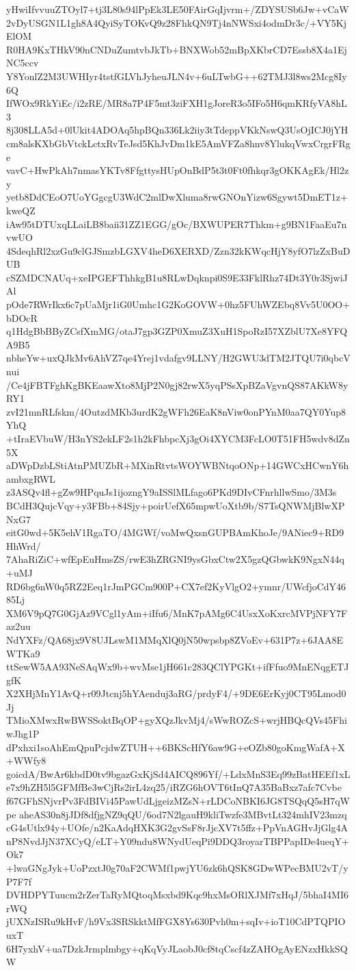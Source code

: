 yHwiIfvvuuZTOyl7+tj3L80s94lPpEk3LE50FAirGqIjvrm+/ZDYSUSb6Jw+vCaW
2vDyUSGN1L1gh8A4QyiSyTOKvQ9z28FhkQN9Tj4nNWSxi4odmDr3c/+VY5KjElOM
R0HA9KxTHkV90nCNDuZumtvbJkTb+BNXWob52mBpXKbrCD7Essb8X4a1EjNC5ccv
Y8YonlZ2M3UWHIyr4tstfGLVhJyheuJLN4v+6uLTwbG++62TMJ3l8ws2Mcg8Iy6Q
IfWOx9RkYiEc/i2zRE/MR8a7P4F5mt3ziFXH1gJoreR3o5IFo5H6qmKRfyVA8hL3
8j308LLA5d+0lUkit4ADOAq5hpBQn336Lk2iiy3tTdeppVKkNswQ3UsOjICJ0jYH
cm8alsKXbGbVtckLctxRvTeJsd5KhJvDm1kE5AmVFZa8hnv8YlukqVwxCrgrFRge
vavC+HwPkAh7nmasYKTv8FfgttysHUpOnBdP5t3t0Ft0fhkqr3gOKKAgEk/Hl2zy
yetb8DdCEoO7UoYGgcgU3WdC2mlDwXluma8rwGNOnYizw6Sgywt5DmET1z+kweQZ
iAw95tDTUxqLLaiLB8baii31ZZ1EGG/gOc/BXWUPER7Thkm+g9BN1FaaEu7nvwUO
4SdeqhRl2xzGu9clGJSmzbLGXV4heD6XERXD/Zzn32kKWqcHjY8yfO7lzZxBuDUB
cSZMDCNAUq+xeIPGEFThhkgB1u8RLwDqknpi0S9E33FklRhz74Dt3Y0r3SjwiJAl
pOde7RWrIkx6c7pUaMjr1iG0Umhc1G2KoGOVW+0hz5FUhWZEbq8Vv5U0OO+bDOcR
q1HdgBbBByZCsfXmMG/otaJ7gp3GZP0XmuZ3XuH1SpoRzI57XZblU7Xe8YFQA9B5
nbheYw+uxQJkMv6AhVZ7qe4Yrej1vdafgv9LLNY/H2GWU3dTM2JTQU7i0qbcVnui
/Ce4jFBTFghKgBKEaawXto8MjP2N0gj82rwX5yqPSsXpBZaVgvnQS87AKkW8yRY1
zvI21mnRLfskm/4OutzdMKb3urdK2gWFh26EaK8nViw0onPYnM0aa7QY0Yup8YhQ
+tIraEVbuW/H3nYS2ekLF2s1h2kFhbpcXj3gOi4XYCM3FcLO0T51FH5wdv8dZn5X
aDWpDzbLStiAtnPMUZbR+MXinRtvtsWOYWBNtqoONp+14GWCxHCwnY6hambxgRWL
z3ASQv4fl+gZw9HPquJs1ijozngY9aISSlMLfago6PKd9DIvCFnrhllwSmo/3M3s
BCdH3QujcVqy+y3FBb+84Sjy+poirUefX65mpwUoXtb9b/S7TsQNWMjBlwXPNxG7
eitG0wd+5K5ehV1RgaTO/4MGWf/voMwQxsnGUPBAmKhoJe/9ANiec9+RD9HhWrd/
7AhaRiZiC+wfEpEuHmsZS/rwE3hZRGNI9ysGbxCtw2X5gzQGbwkK9NgxN44q+uMJ
RD6bg6nW0q5RZ2Eeq1rJmPGCm900P+CX7ef2KyVlgO2+ymnr/UWcfjoCdY4685Lj
XM6V9pQ7G0GjAz9VCgl1yAm+iIfu6/MnK7pAMg6C4UsxXoKxrcMVPjNFY7Faz2uu
NdYXFz/QA68jx9V8UJLswM1MMqXlQ0jN50wpsbp8ZVoEv+631P7z+6JAA8EWTKa9
ttSewW5AA93NeSAqWx9b+wvMse1jH661c283QClYPGKt+ifFfuo9MnENqgETJgfK
X2XHjMnY1AvQ+r09Jtcnj5hYAenduj3aRG/prdyF4/+9DE6ErKyj0CT95Lmod0Jj
TMioXMwxRwBWSSoktBqOP+gyXQzJkvMj4/sWwROZcS+wrjHBQcQVs45FhiwJhg1P
dPxhxi1soAhEmQpuPcjdwZTUH++6BKScHfY6aw9G+eOZb80goKmgWafA+X+WWfy8
goicdA/BwAr6kbdD0tv9bgazGxKjSd4AICQ896Yf/+LdxMnS3Eq99zBatHEEf1xL
e7x9hZH5l5GFMfBe3wCjRs2irL4zq25/iRZG6hOVT6tInQ7A35BaBxz7afc7Cvbe
f67GFhSNjvrPv3FdBIVi45PawUdLjgeizMZsN+rLDCoNBKI6JG8TSQqQ5sH7qWpe
aheAS30n8jJDf8dfjgNZ9qQU/6od7N2lgauH9kliTwzfe3MBvtLt324mhIV23mzq
cG4sUtlx94y+UOfe/n2KaAdqHXK3G2gvSsF8rJjcXV7t5ffz+PpVnAGHvJjGlg4A
nP8NvdJjN37XCyQ/eLT+Y09ndu8WNydUeqPi9DDQ3royarTBPPapIDe4ueqY+Ok7
+lwaGNgJyk+UoPzxtJ0g70aF2CWMf1pwjYU6zk6hQSK8GDwWPecBMU2vT/yP7F7f
DVHDPYTuucm2rZerTaRyMQtoqMsxbd9Kqc9hxMsORlXJMf7xHqJ/5bhaI4MI6rWQ
jUXNzISRu9kHvF/h9Vx3SRSkktMfFGX8Ys630Pvh0m+sqIv+ioT10CdPTQPIOuxT
6H7yxhV+ua7DzkJrmplmbgy+qKqVyJLaobJ0cf8tqCscf4zZAHOgAyENzxHkkSQW
